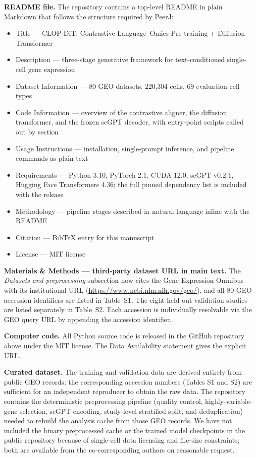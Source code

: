 \documentclass[11pt,letterpaper]{article}
\begin{document}
\noindent\textbf{README file.} The repository contains a top-level README in plain Markdown that follows the structure required by PeerJ:
\begin{itemize}
  \item Title --- CLOP-DiT: Contrastive Language--Omics Pre-training + Diffusion Transformer
  \item Description --- three-stage generative framework for text-conditioned single-cell gene expression
  \item Dataset Information --- 80 GEO datasets, 220{,}304 cells, 69 evaluation cell types
  \item Code Information --- overview of the contrastive aligner, the diffusion transformer, and the frozen scGPT decoder, with entry-point scripts called out by section
  \item Usage Instructions --- installation, single-prompt inference, and pipeline commands as plain text
  \item Requirements --- Python 3.10, PyTorch 2.1, CUDA 12.0, scGPT v0.2.1, Hugging Face Transformers 4.36; the full pinned dependency list is included with the release
  \item Methodology --- pipeline stages described in natural language inline with the README
  \item Citation --- BibTeX entry for this manuscript
  \item License --- MIT license
\end{itemize}

\noindent\textbf{Materials \& Methods --- third-party dataset URL in main text.} The \emph{Datasets and preprocessing} subsection now cites the Gene Expression Omnibus with its institutional URL (\url{https://www.ncbi.nlm.nih.gov/geo/}), and all 80 GEO accession identifiers are listed in Table~S1. The eight held-out validation studies are listed separately in Table~S2. Each accession is individually resolvable via the GEO query URL by appending the accession identifier.

\noindent\textbf{Computer code.} All Python source code is released in the GitHub repository above under the MIT license. The Data Availability statement gives the explicit URL.

\noindent\textbf{Curated dataset.} The training and validation data are derived entirely from public GEO records; the corresponding accession numbers (Tables S1 and S2) are sufficient for an independent reproducer to obtain the raw data. The repository contains the deterministic preprocessing pipeline (quality control, highly-variable-gene selection, scGPT encoding, study-level stratified split, and deduplication) needed to rebuild the analysis cache from those GEO records. We have not included the binary preprocessed cache or the trained model checkpoints in the public repository because of single-cell data licensing and file-size constraints; both are available from the co-corresponding authors on reasonable request.
\end{document}
